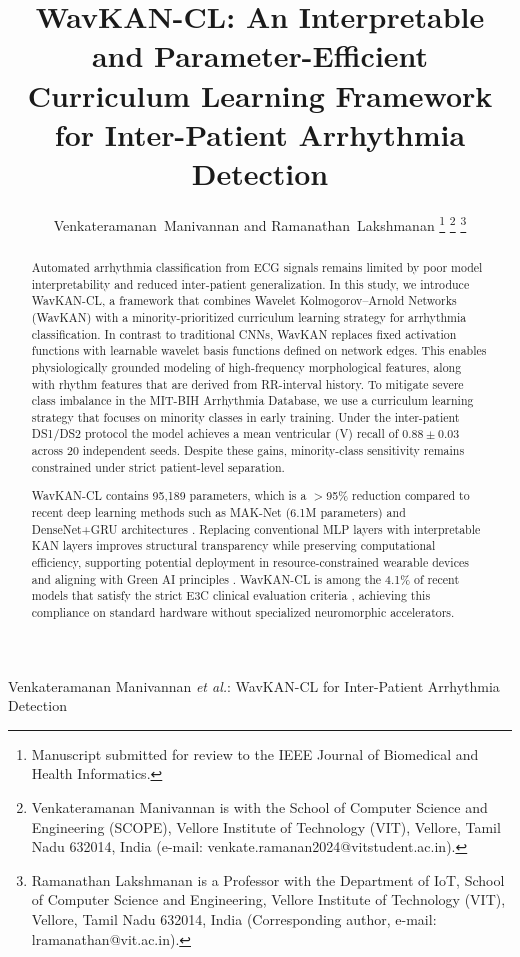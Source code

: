 \documentclass[journal,twoside,web]{ieeecolor}
\begin{document}
\title{\vspace{15mm}WavKAN-CL: An Interpretable and Parameter-Efficient Curriculum Learning Framework for Inter-Patient Arrhythmia Detection}

\author{Venkateramanan~Manivannan and Ramanathan~Lakshmanan
\thanks{Manuscript submitted for review to the IEEE Journal of Biomedical and Health Informatics.}
\thanks{Venkateramanan Manivannan is with the School of Computer Science
and Engineering (SCOPE), Vellore Institute of Technology (VIT), Vellore,
Tamil Nadu 632014, India (e-mail: venkate.ramanan2024@vitstudent.ac.in).}
\thanks{Ramanathan Lakshmanan is a Professor with the Department of IoT,
School of Computer Science and Engineering, Vellore Institute of Technology (VIT), Vellore,
Tamil Nadu 632014, India (Corresponding author, e-mail: lramanathan@vit.ac.in).}}

{Venkateramanan Manivannan \MakeLowercase{\textit{et al.}}: WavKAN-CL for Inter-Patient Arrhythmia Detection}

\maketitle

\begin{abstract}
Automated arrhythmia classification from ECG signals remains limited by poor model interpretability and reduced inter-patient generalization. In this study, we introduce WavKAN-CL, a framework that combines Wavelet Kolmogorov--Arnold Networks (WavKAN) with a minority-prioritized curriculum learning strategy for arrhythmia classification. In contrast to traditional CNNs, WavKAN replaces fixed activation functions with learnable wavelet basis functions defined on network edges. This enables physiologically grounded modeling of high-frequency morphological features, along with rhythm features that are derived from RR-interval history. To mitigate severe class imbalance in the MIT-BIH Arrhythmia Database, we use a curriculum learning strategy that focuses on minority classes in early training. Under the inter-patient DS1/DS2 protocol the model achieves a mean ventricular (V) recall of $0.88 \pm 0.03$ across 20 independent seeds. Despite these gains, minority-class sensitivity remains constrained under strict patient-level separation.

WavKAN-CL contains 95,189 parameters, which is a $>$95\% reduction compared to recent deep learning methods such as MAK-Net (6.1M parameters) \cite{zhao_mak-net_2025} and DenseNet+GRU architectures \cite{guo_inter-patient_2019}. Replacing conventional MLP layers with interpretable KAN layers improves structural transparency while preserving computational efficiency, supporting potential deployment in resource-constrained wearable devices and aligning with Green AI principles \cite{farag_tiny_2023}. WavKAN-CL is among the 4.1\% of recent models that satisfy the strict E3C clinical evaluation criteria \cite{silva_systematic_2025}, achieving this compliance on standard hardware without specialized neuromorphic accelerators.
\end{abstract}
\end{document}

